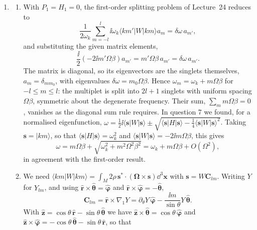 \documentclass[a4paper,10pt]{paper}
\begin{document}
\begin{enumerate}
\item
\begin{enumerate}
\item With $P_{1}=H_{1}=0$, the first-order splitting problem of Lecture~24 reduces to
\begin{equation*}
    \frac{1}{2\omega_{k}}\sum_{m=-l}^{l}\ii\omega_{k}\langle km'|W|km\rangle a_{m}=\delta\omega\,a_{m'},
\end{equation*}
and substituting the given matrix elements,
\begin{equation*}
    \frac{\ii}{2}(-2\ii m'\Omega\beta)a_{m'}=m'\Omega\beta\,a_{m'}=\delta\omega\,a_{m'}.
\end{equation*}
The matrix is diagonal, so its eigenvectors are the singlets themselves, $a_{m}=\delta_{mm_{0}}$, with eigenvalues $\delta\omega=m_{0}\Omega\beta$. 
Hence $\omega_{m}=\omega_{k}+m\Omega\beta$ for $-l\le m\le l$: the multiplet is split into $2l+1$ singlets with uniform spacing $\Omega\beta$, 
symmetric about the degenerate frequency. Their sum, $\sum_{m}m\Omega\beta=0$, vanishes as the diagonal sum rule requires. In question 7 we found, 
for a normalised eigenfunction, $\omega=\tfrac{1}{2}\ii\langle\mathbf{s}|W|\mathbf{s}\rangle\pm\sqrt{\langle\mathbf{s}|H|\mathbf{s}\rangle-\tfrac{1}{4}\langle\mathbf{s}|W|\mathbf{s}\rangle^{2}}$. 
Taking $\mathbf{s}=|km\rangle$, so that $\langle\mathbf{s}|H|\mathbf{s}\rangle=\omega_{k}^{2}$ and $\langle\mathbf{s}|W|\mathbf{s}\rangle=-2\ii m\Omega\beta$, this gives
\begin{equation*}
    \omega=m\Omega\beta+\sqrt{\omega_{k}^{2}+m^{2}\Omega^{2}\beta^{2}}=\omega_{k}+m\Omega\beta+O(\Omega^{2}),
\end{equation*}
in agreement with the first-order result.
\item We need $\langle km|W|km\rangle=\int_{M}2\rho\,\mathbf{s}^{*}\cdot(\bm{\Omega}\times\mathbf{s})\dd^{3}\mathbf{x}$ with $\mathbf{s}=W\mathbf{C}_{lm}$. 
Writing $Y$ for $Y_{lm}$, and using $\hat{\mathbf{r}}\times\hat{\bm{\theta}}=\hat{\bm{\varphi}}$ and $\hat{\mathbf{r}}\times\hat{\bm{\varphi}}=-\hat{\bm{\theta}}$,
\begin{equation*}
    \mathbf{C}_{lm}=\hat{\mathbf{r}}\times\nabla_{1}Y=\partial_{\theta}Y\,\hat{\bm{\varphi}}-\frac{\ii m}{\sin\theta}Y\,\hat{\bm{\theta}}.
\end{equation*}
With $\hat{\mathbf{z}}=\cos\theta\,\hat{\mathbf{r}}-\sin\theta\,\hat{\bm{\theta}}$ we have 
$\hat{\mathbf{z}}\times\hat{\bm{\theta}}=\cos\theta\,\hat{\bm{\varphi}}$ and $\hat{\mathbf{z}}\times\hat{\bm{\varphi}}=-\cos\theta\,\hat{\bm{\theta}}-\sin\theta\,\hat{\mathbf{r}}$, so that

\end{enumerate}
\end{enumerate}
\end{document}
